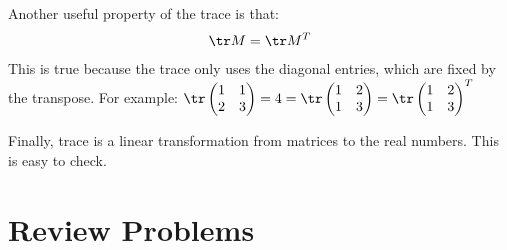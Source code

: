 Another useful property of the trace is that:
\[\tr M = \tr M^T\] 
This is true because the trace only uses the diagonal entries, which are fixed by the transpose.  For example:
$\tr \begin{pmatrix}
1 & 1 \\
2 & 3 \\
\end{pmatrix} = 4 = \tr \begin{pmatrix}
1 & 2 \\
1 & 3 \\
\end{pmatrix} = \tr \begin{pmatrix}
1 & 2 \\
1 & 3 \\
\end{pmatrix}^T
$

Finally, trace is a linear transformation from matrices to the real numbers.  This is easy to check.


%
%
%
%
%

%

\section{Review Problems}


